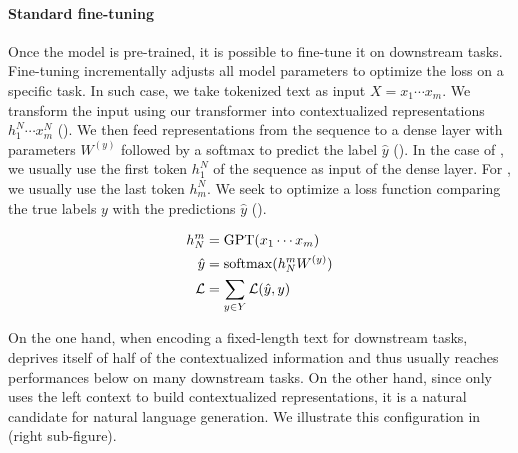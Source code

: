 \paragraph{Standard fine-tuning} Once the model is pre-trained, it is possible to fine-tune it on downstream tasks. Fine-tuning incrementally adjusts all model parameters to optimize the loss on a specific task. In such case, we take tokenized text as input $X = x_1 \cdots x_m$. We transform the input using our transformer into contextualized representations $h^N_1 \cdots x^N_m$ (). We then feed representations from the sequence to a dense layer with parameters $W^{(y)}$ followed by a softmax to predict the label $\hat{y}$ (). In the case of \bert, we usually use the first token $h^N_1$ of the sequence as input of the dense layer. For \gpt, we usually use the last token $h^N_m$. We seek to optimize a loss function comparing the true labels $y$ with the predictions $\hat{y}$ (). 

\begin{align}
    h_N^m &= \textrm{GPT}(x_1 \cdots x_m) \labeq{generative:gpt-std} \\
    \hat{y} &= \softmax(h_N^m W^{(y)}) \labeq{generative:softmax} \\
    \mathcal{L} &= \sum_{y \in Y} \mathcal{L}(\hat{y}, y) \labeq{generative:loss} 
\end{align}

On the one hand, when encoding a fixed-length text for downstream tasks, \gpt deprives itself of half of the contextualized information and thus usually reaches performances below \bert on many downstream tasks. On the other hand, since \gpt only uses the left context to build contextualized representations, it is a natural candidate for natural language generation. We illustrate this configuration in  (right sub-figure).


